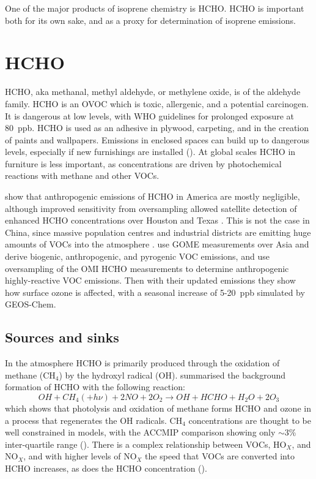         
    One of the major products of isoprene chemistry is HCHO.
    HCHO is important both for its own sake, and as a proxy for determination of isoprene emissions.
    
\section{HCHO}
\label{LR:HCHO}
  HCHO, aka methanal, methyl aldehyde, or methylene oxide, is of the aldehyde family.
  HCHO is an OVOC which is toxic, allergenic, and a potential carcinogen. 
  It is dangerous at low levels, with WHO guidelines for prolonged exposure at 80~ppb.
  HCHO is used as an adhesive in plywood, carpeting, and in the creation of paints and wallpapers.
  Emissions in enclosed spaces can build up to dangerous levels, especially if new furnishings are installed (\cite{Davenport2015}).
  At global scales HCHO in furniture is less important, as concentrations are driven by photochemical reactions with methane and other VOCs.
  
  \cite{Millet2008} show that anthropogenic emissions of HCHO in America are mostly negligible, although improved sensitivity from oversampling allowed satellite detection of enhanced HCHO concentrations over Houston and Texas \citep{Zhu2014}.
  This is not the case in China, since massive population centres and industrial districts are emitting huge amounts of VOCs into the atmosphere \citep{Fu2007}.
  \cite{Fu2007} use GOME measurements over Asia and derive biogenic, anthropogenic, and pyrogenic VOC emissions, and \cite{Zhu2014} use oversampling of the OMI HCHO measurements to determine anthropogenic highly-reactive VOC emissions.
  Then with their updated emissions they show how surface ozone is affected, with a seasonal increase of 5-20~ppb simulated by GEOS-Chem.
  
  \subsection{Sources and sinks}
    \label{LR:HCHO:Sources}
     
    In the atmosphere HCHO is primarily produced through the oxidation of methane (CH$_4$) by the hydroxyl radical (OH).
    \cite{Atkinson2000} summarised the background formation of HCHO with the following reaction:
    \begin{equation*} \label{LR:HCHO:Sources:eqn_MethaneBackground}
      OH + CH_4 (+ h\nu) + 2NO + 2O_2 \rightarrow OH + HCHO + H_2O + 2O_3
    \end{equation*}
    which shows that photolysis and oxidation of methane forms HCHO and ozone in a process that regenerates the OH radicals.
    CH$_4$ concentrations are thought to be well constrained in models, with the ACCMIP comparison showing only $\sim3$\% inter-quartile range (\cite{Young2013}).
    There is a complex relationship between VOCs, HO$_X$, and NO$_X$, and with higher levels of NO$_X$ the speed that VOCs are converted into HCHO increases, as does the HCHO concentration (\cite{Wolfe2016}).
    
